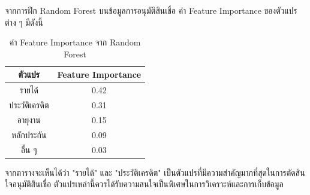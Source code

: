 \begin{exmp}
\label{exmp:feature_importance}
จากการฝึก Random Forest บนข้อมูลการอนุมัติสินเชื่อ ค่า Feature Importance ของตัวแปรต่าง ๆ มีดังนี้

\begin{table}[h!]
\centering
\caption{ค่า Feature Importance จาก Random Forest}
\label{tab:feature_importance}
\begin{tabular}{|c|c|}
\hline
\textbf{ตัวแปร} & \textbf{Feature Importance} \\ \hline
รายได้ & 0.42 \\ \hline
ประวัติเครดิต & 0.31 \\ \hline
อายุงาน & 0.15 \\ \hline
หลักประกัน & 0.09 \\ \hline
อื่น ๆ & 0.03 \\ \hline
\end{tabular}
\end{table}

จากตารางจะเห็นได้ว่า "รายได้" และ "ประวัติเครดิต" เป็นตัวแปรที่มีความสำคัญมากที่สุดในการตัดสินใจอนุมัติสินเชื่อ ตัวแปรเหล่านี้ควรได้รับความสนใจเป็นพิเศษในการวิเคราะห์และการเก็บข้อมูล
\end{exmp}



\newpage

